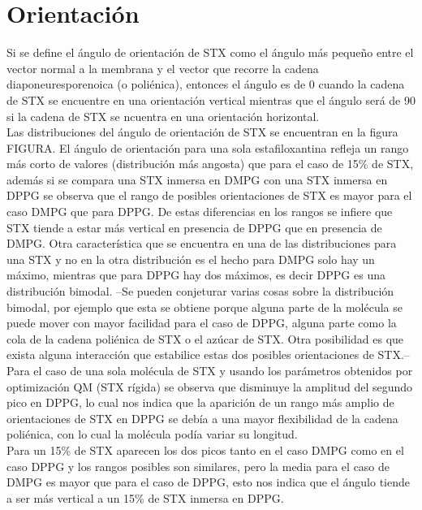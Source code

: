 \section{Orientación}
Si se define el ángulo de orientación de STX como el ángulo más pequeño entre el vector normal a la membrana y el vector que recorre la cadena diaponeuresporenoica (o poliénica), entonces el ángulo es de 0 \textdegree cuando la cadena de STX se encuentre en una orientación vertical mientras que el ángulo será de 90 \textdegree si  la cadena de STX se ncuentra en una orientación horizontal.\\
Las distribuciones del ángulo de orientación de STX se encuentran en la figura FIGURA. El ángulo de orientación para una sola estafiloxantina refleja un rango más corto de valores (distribuci\'{o}n m\'{a}s angosta) que para el caso de 15\% de STX, además si se compara una STX inmersa en DMPG con una STX inmersa en DPPG se observa que el rango de posibles orientaciones de STX es mayor para el caso DMPG que para DPPG. De estas diferencias en los rangos se infiere que STX tiende a estar más vertical en presencia de DPPG que en presencia de DMPG. Otra característica que se encuentra en una de las distribuciones para una STX y no en la otra distribución es el hecho para DMPG solo hay un máximo, mientras que para DPPG hay dos máximos, es decir DPPG es una distribución bimodal. --Se pueden conjeturar varias cosas sobre la distribución bimodal, por ejemplo que esta se obtiene porque alguna parte de la molécula se puede mover con mayor facilidad para el caso de DPPG, alguna parte como la cola de la cadena poliénica de STX o el az\'{u}car de STX. Otra posibilidad es que exista alguna interacción que estabilice estas dos posibles orientaciones de STX.--\\

Para el caso de una sola molécula de STX y usando los parámetros obtenidos por optimización QM (STX rígida) se observa que disminuye la amplitud del segundo pico en DPPG, lo cual nos indica que la aparición de un rango más amplio de orientaciones de STX en DPPG se debía a una mayor flexibilidad de la cadena poliénica, con lo cual la molécula podía variar su longitud.\\

Para un 15\% de STX aparecen los dos picos tanto en el caso DMPG como en el caso DPPG y los rangos posibles son similares, pero la media para el caso de DMPG es mayor que para el caso de DPPG, esto nos indica que el ángulo tiende a ser más vertical a un 15\% de STX inmersa en DPPG.\\ 

